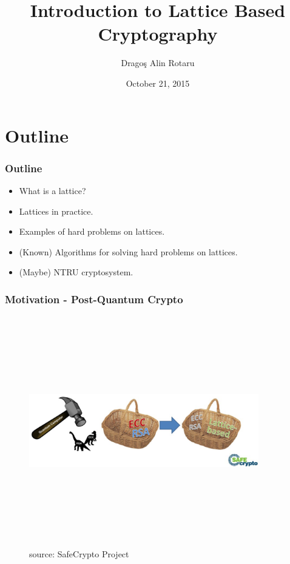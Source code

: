 \documentclass{beamer}
\title[Bitdefender, University of Bucharest]{Introduction to Lattice Based Cryptography}
\author[D.A.Rotaru]{Drago\c{s} Alin Rotaru} %
\institute[Bitdefender, Unibuc] %
{
Bitdefender Romania,
University of Bucharest\\ %
}
\date{October 21, 2015} %
\begin{document}
\begin{frame}
\titlepage %
\end{frame}



\section{Outline} %

\begin{frame}
    \frametitle{Outline} %
    \begin{itemize}
        \item What is a lattice?
        \item Lattices in practice.
        \item Examples of hard problems on lattices.
        \item (Known) Algorithms for solving hard problems on lattices.
        \item (Maybe) NTRU cryptosystem.
    \end{itemize}
\end{frame}



\begin{frame}
    \frametitle{Motivation - Post-Quantum Crypto}
    \begin{figure}
          \includegraphics[width=10cm,height=10cm,keepaspectratio]{img/quantum_attacks.png}
          \caption{source: SafeCrypto Project}
    \end{figure}
\end{frame}
\end{document}
